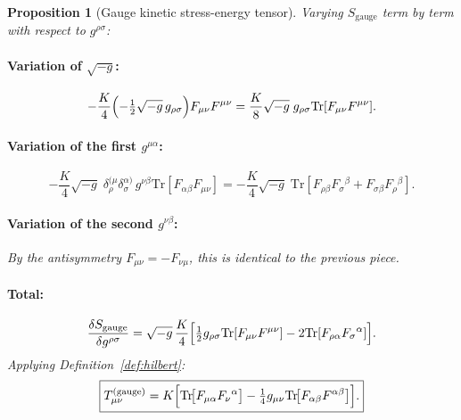 \documentclass[12pt]{article}
\newtheorem{proposition}[definition]{Proposition}
\newcommand{\Tr}{\mathrm{Tr}}
\begin{document}
\begin{proposition}[Gauge kinetic stress-energy tensor]
\label{prop:T_gauge}
Varying $S_{\mathrm{gauge}}$ term by term with respect to $g^{\rho\sigma}$:

\paragraph{Variation of $\sqrt{-g}$:}
\begin{equation}
  -\frac{K}{4}\Bigl(-\tfrac{1}{2}\sqrt{-g}\,g_{\rho\sigma}\Bigr)
  F_{\mu\nu}F^{\mu\nu}
  = \frac{K}{8}\sqrt{-g}\;g_{\rho\sigma}\Tr[F_{\mu\nu}F^{\mu\nu}].
\end{equation}

\paragraph{Variation of the first $g^{\mu\alpha}$:}
\begin{equation}
  -\frac{K}{4}\sqrt{-g}\;\delta^{(\mu}_\rho\delta^{\alpha)}_\sigma
  \,g^{\nu\beta}\Tr[F_{\alpha\beta}F_{\mu\nu}]
  = -\frac{K}{4}\sqrt{-g}\;\Tr[F_{\rho\beta}F_\sigma{}^\beta
    + F_{\sigma\beta}F_\rho{}^\beta].
\end{equation}

\paragraph{Variation of the second $g^{\nu\beta}$:}
By the antisymmetry $F_{\mu\nu} = -F_{\nu\mu}$,
this is identical to the previous piece.

\paragraph{Total:}
\begin{equation}
  \frac{\delta S_{\mathrm{gauge}}}{\delta g^{\rho\sigma}}
  = \sqrt{-g}\,\frac{K}{4}\Bigl[
      \tfrac{1}{2}g_{\rho\sigma}\Tr[F_{\mu\nu}F^{\mu\nu}]
      - 2\Tr[F_{\rho\alpha}F_\sigma{}^{\alpha}]
    \Bigr].
\end{equation}
Applying Definition~\ref{def:hilbert}:
\begin{equation}
  \label{eq:T_gauge}
  \boxed{
    T^{(\mathrm{gauge})}_{\mu\nu}
    = K\Bigl[
        \Tr\!\bigl[F_{\mu\alpha}F_\nu{}^{\alpha}\bigr]
        -\tfrac{1}{4}g_{\mu\nu}\Tr\!\bigl[F_{\alpha\beta}F^{\alpha\beta}\bigr]
      \Bigr].
  }
\end{equation}
\end{proposition}
\end{document}
